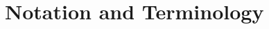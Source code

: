\documentclass[usenames,dvipsnames]{article}
\theoremstyle{plain}
\theoremstyle{plain}
\newtheorem{theorem}{Theorem}
\newtheorem*{remark}{Remark}
\DeclareMathOperator{\codim}{codim}
\DeclareMathOperator{\lhdim}{\underline{\dim}_{\mathbf{M}}}
\begin{document}
%
%




\section{Notation and Terminology}
\end{document}
